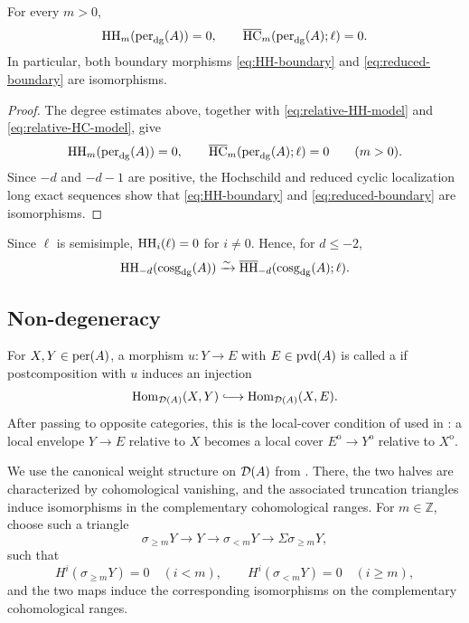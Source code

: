 \documentclass[11pt,a4paper,dvipsnames,x11names]{amsart}
\begin{document}
\begin{prop}\label{prop:reduced-vanishing}
For every $m>0$,
\[
\operatorname{HH}_m(\operatorname{per}_{\mathrm{dg}}(A))=0,
\qquad
\overline{\operatorname{HC}}_m(\operatorname{per}_{\mathrm{dg}}(A);\ell)=0.
\]
In particular, both boundary morphisms \eqref{eq:HH-boundary} and \eqref{eq:reduced-boundary} are isomorphisms.
\end{prop}

\begin{proof}
The degree estimates above, together with \eqref{eq:relative-HH-model} and \eqref{eq:relative-HC-model}, give
\[
\operatorname{HH}_m(\operatorname{per}_{\mathrm{dg}}(A))=0,
\qquad
\overline{\operatorname{HC}}_m(\operatorname{per}_{\mathrm{dg}}(A);\ell)=0
\qquad(m>0).
\]
Since $-d$ and $-d-1$ are positive, the Hochschild and reduced cyclic localization long exact sequences show that \eqref{eq:HH-boundary} and \eqref{eq:reduced-boundary} are isomorphisms.
\end{proof}

Since $\ell$ is semisimple, $\operatorname{HH}_i(\ell)=0$ for $i\neq0$. Hence, for $d\leq-2$,
\begin{equation}\label{eq:reduced-HH-identification}
\operatorname{HH}_{-d}(\operatorname{cosg}_{\mathrm{dg}}(A))\xrightarrow{\sim}\overline{\operatorname{HH}}_{-d}(\operatorname{cosg}_{\mathrm{dg}}(A);\ell).
\end{equation}

\subsection{Non-degeneracy}

For $X,Y\in\operatorname{per}(A)$, a morphism $u:Y\to E$ with $E\in\operatorname{pvd}(A)$ is called a  if postcomposition with $u$ induces an injection
\[
    \Hom_{\D(A)}(X,Y)\lhook\joinrel\longrightarrow\Hom_{\D(A)}(X,E).
\]
After passing to opposite categories, this is the local-cover condition of \cite[Definition~1.2]{Amiot09} used in \cite[Lemma~4.3.4]{HaniharaLiu26}: a local envelope $Y\to E$ relative to $X$ becomes a local cover $E^{\mathrm{o}}\to Y^{\mathrm{o}}$ relative to $X^{\mathrm{o}}$.

We use the canonical weight structure on $\mathcal D(A)$ from \cite[Corollary~5.1]{KN13}. There, the two halves are characterized by cohomological vanishing, and the associated truncation triangles induce isomorphisms in the complementary cohomological ranges. For $m\in\mathbb Z$, choose such a triangle
\begin{equation}\label{eq:positive-weight-truncation}
    \sigma_{\geq m}Y\longrightarrow Y\longrightarrow\sigma_{<m}Y\longrightarrow\Sigma\sigma_{\geq m}Y,
\end{equation}
such that
\[
    H^i(\sigma_{\geq m}Y)=0\quad(i<m),
    \qquad
    H^i(\sigma_{<m}Y)=0\quad(i\geq m),
\]
and the two maps induce the corresponding isomorphisms on the complementary cohomological ranges.
\end{document}

